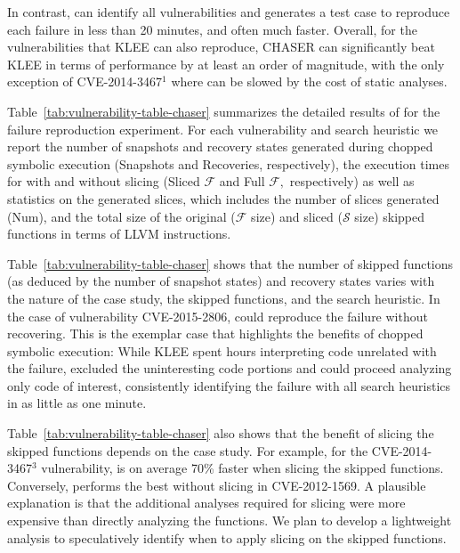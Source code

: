 In contrast, \toolname can identify all vulnerabilities and generates
a test case to reproduce each failure in less than 20 minutes, and
often much faster. Overall, for the vulnerabilities that KLEE can also
reproduce, CHASER can significantly beat KLEE in terms of performance
by at least an order of magnitude, with the only exception of
CVE-2014-3467$^1$ where \toolname can be slowed by the cost of static
analyses.

Table~\ref{tab:vulnerability-table-chaser} summarizes the detailed
results of \toolname for the failure reproduction experiment. For each
vulnerability and search heuristic we report the number of snapshots
and recovery states generated during chopped symbolic execution
(Snapshots and Recoveries, respectively), the execution times for
\toolname with and without slicing (Sliced $\mathcal{F}$ and Full
$\mathcal{F},$ respectively) as well as statistics on the generated
slices, which includes the number of slices generated (Num), and the
total size of the original ($\mathcal{F}$ size) and sliced
($\mathcal{S}$ size) skipped functions in terms of LLVM instructions.

Table~\ref{tab:vulnerability-table-chaser} shows that the number of
skipped functions (as deduced by the number of snapshot states) and
recovery states varies with the nature of the case study, the skipped
functions, and the search heuristic. In the case of vulnerability
CVE-2015-2806, \toolname could reproduce the failure without
recovering. This is the exemplar case that highlights the benefits of
chopped symbolic execution: While KLEE spent hours interpreting code
unrelated with the failure, \toolname excluded the uninteresting code
portions and could proceed analyzing only code of interest,
consistently identifying the failure with all search heuristics in as
little as one minute.

Table~\ref{tab:vulnerability-table-chaser} also shows that the benefit
of slicing the skipped functions depends on the case study. For
example, for the CVE-2014-3467$^3$ vulnerability, \toolname is on
average 70\% faster when slicing the skipped functions. Conversely,
\toolname performs the best without slicing in CVE-2012-1569. A
plausible explanation is that the additional analyses required for
slicing were more expensive than directly analyzing the functions. We
plan to develop a lightweight analysis to speculatively identify when
to apply slicing on the skipped functions.



